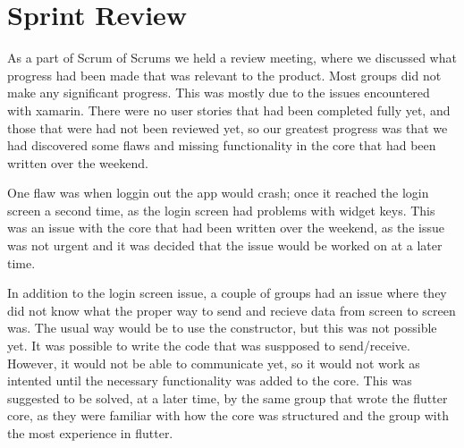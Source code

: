 \section{Sprint Review}
As a part of Scrum of Scrums we held a review meeting, where we discussed what progress had been made that was relevant to the product.
Most groups did not make any significant progress.
This was mostly due to the issues encountered with xamarin.
There were no user stories that had been completed fully yet, and those that were had not been reviewed yet, so our greatest progress was that we had discovered some flaws and missing functionality in the core that had been written over the weekend.

One flaw was when loggin out the app would crash; once it reached the login screen a second time, as the login screen had problems with widget keys. 
This was an issue with the core that had been written over the weekend, as the issue was not urgent and it was decided that the issue would be worked on at a later time.

In addition to the login screen issue, a couple of groups had an issue where they did not know what the proper way to send and recieve data from screen to screen was.
The usual way would be to use the constructor, but this was not possible yet. 
It was possible to write the code that was suspposed to send/receive. 
However, it would not be able to communicate yet, so it would not work as intented until the necessary functionality was added to the core.
This was suggested to be solved, at a later time, by the same group that wrote the flutter core, as they were familiar with how the core was structured and the group with the most experience in flutter.
